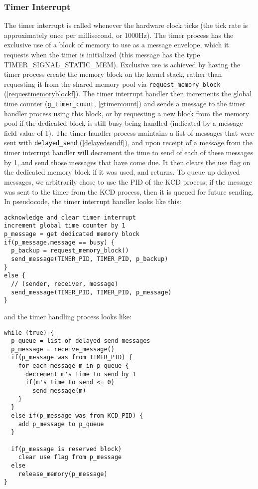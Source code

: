 \documentclass[12pt]{article}
\begin{document}
\subsubsection{Timer Interrupt}\label{timeri}
The timer interrupt is called whenever the hardware clock ticks (the tick rate is approximately once per millisecond, or 1000Hz). The timer process has the exclusive use of a block of memory to use as a message envelope, which it requests when the timer is initialized (this message has the type TIMER\_SIGNAL\_STATIC\_MEM). Exclusive use is achieved by having the timer process create the memory block on the kernel stack, rather than requesting it from the shared memory pool via \verb|request_memory_block| (\ref{requestmemoryblockf}). The timer interrupt handler then increments the global time counter (\verb|g_timer_count|, \ref{gtimercount}) and sends a message to the timer handler process using this block, or by requesting a new block from the memory pool if the dedicated block is still busy being handled (indicated by a message field value of 1). The timer handler process maintains a list of messages that were sent with \verb|delayed_send| (\ref{delayedsendf}), and upon receipt of a message from the timer interrupt handler will decrement the time to send of each of these messages by 1, and send those messages that have come due. It then clears the use flag on the dedicated memory block if it was used, and returns. To queue up delayed messages, we arbitrarily chose to use the PID of the KCD process; if the message was sent to the timer from the KCD process, then it is queued for future sending. In pseudocode, the timer interrupt handler looks like this:
\begin{lstlisting}
acknowledge and clear timer interrupt
increment global time counter by 1
p_message = get dedicated memory block
if(p_message.message == busy) {
  p_backup = request_memory_block()
  send_message(TIMER_PID, TIMER_PID, p_backup)
}
else {
  // (sender, receiver, message)
  send_message(TIMER_PID, TIMER_PID, p_message)
}
\end{lstlisting}

and the timer handling process looks like:
\begin{lstlisting}
while (true) {
  p_queue = list of delayed send messages
  p_message = receive_message()
  if(p_message was from TIMER_PID) {
    for each message m in p_queue {
      decrement m's time to send by 1
      if(m's time to send <= 0)
        send_message(m)
    }
  }
  else if(p_message was from KCD_PID) {
    add p_message to p_queue
  }

  if(p_message is reserved block)
    clear use flag from p_message
  else
    release_memory(p_message)
}
\end{lstlisting}
\end{document}
